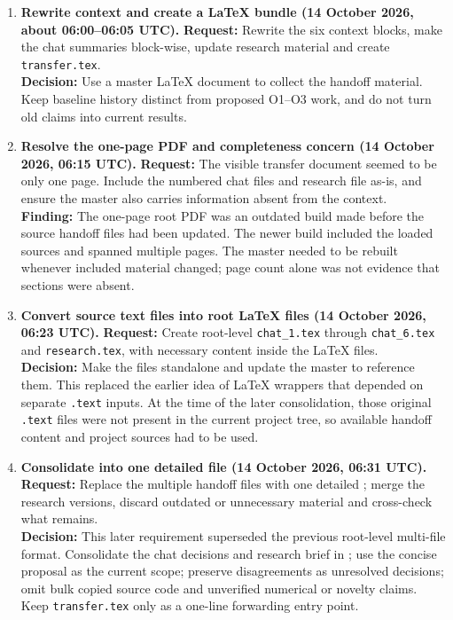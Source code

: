 \documentclass[10pt,a4paper]{article}
\begin{document}
\begin{enumerate}[label=\textbf{Step \arabic*.}]
\item \textbf{Rewrite context and create a LaTeX bundle (14 October 2026, about 06:00--06:05 UTC).}
\textbf{Request:} Rewrite the six context blocks, make the chat summaries block-wise, update research material and create \texttt{transfer.tex}.\\
\textbf{Decision:} Use a master LaTeX document to collect the handoff material. Keep baseline history distinct from proposed O1--O3 work, and do not turn old claims into current results.

\item \textbf{Resolve the one-page PDF and completeness concern (14 October 2026, 06:15 UTC).}
\textbf{Request:} The visible transfer document seemed to be only one page. Include the numbered chat files and research file as-is, and ensure the master also carries information absent from the context.\\
\textbf{Finding:} The one-page root PDF was an outdated build made before the source handoff files had been updated. The newer build included the loaded sources and spanned multiple pages. The master needed to be rebuilt whenever included material changed; page count alone was not evidence that sections were absent.

\item \textbf{Convert source text files into root LaTeX files (14 October 2026, 06:23 UTC).}
\textbf{Request:} Create root-level \texttt{chat\_1.tex} through \texttt{chat\_6.tex} and \texttt{research.tex}, with necessary content inside the LaTeX files.\\
\textbf{Decision:} Make the files standalone and update the master to reference them. This replaced the earlier idea of LaTeX wrappers that depended on separate \texttt{.text} inputs. At the time of the later consolidation, those original \texttt{.text} files were not present in the current project tree, so available handoff content and project sources had to be used.

\item \textbf{Consolidate into one detailed file (14 October 2026, 06:31 UTC).}
\textbf{Request:} Replace the multiple handoff files with one detailed ; merge the research versions, discard outdated or unnecessary material and cross-check what remains.\\
\textbf{Decision:} This later requirement superseded the previous root-level multi-file format. Consolidate the chat decisions and research brief in ; use the concise proposal as the current scope; preserve disagreements as unresolved decisions; omit bulk copied source code and unverified numerical or novelty claims. Keep \texttt{transfer.tex} only as a one-line forwarding entry point.


\end{enumerate}
\end{document}
